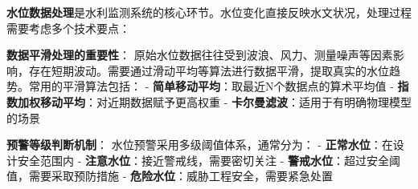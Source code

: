 \textbf{水位数据处理}是水利监测系统的核心环节。水位变化直接反映水文状况，处理过程需要考虑多个技术要点：

\textbf{数据平滑处理的重要性}： 原始水位数据往往受到波浪、风力、测量噪声等因素影响，存在短期波动。需要通过滑动平均等算法进行数据平滑，提取真实的水位趋势。常用的平滑算法包括： - \textbf{简单移动平均}：取最近N个数据点的算术平均值 - \textbf{指数加权移动平均}：对近期数据赋予更高权重 - \textbf{卡尔曼滤波}：适用于有明确物理模型的场景

\textbf{预警等级判断机制}： 水位预警采用多级阈值体系，通常分为： - \textbf{正常水位}：在设计安全范围内 - \textbf{注意水位}：接近警戒线，需要密切关注 - \textbf{警戒水位}：超过安全阈值，需要采取预防措施 - \textbf{危险水位}：威胁工程安全，需要紧急处置

\begin{Shaded}
\begin{Highlighting}[]
        \NormalTok{ (}\OperatorTok{!}
              \NormalTok{(}\NormalTok{)}\OperatorTok{;}
\NormalTok{        \}}
        
        \OperatorTok{=} \NormalTok{()}\OperatorTok{;}
        
        \OperatorTok{=} \NormalTok{)}\OperatorTok{;}
        
        \NormalTok{ \{}
            \OperatorTok{:}\OperatorTok{,}
            \OperatorTok{:}\OperatorTok{,}
            \OperatorTok{:}
\NormalTok{        \}}\OperatorTok{;}
\NormalTok{    \}}
\NormalTok{\}}
\end{Highlighting}
\end{Shaded}


